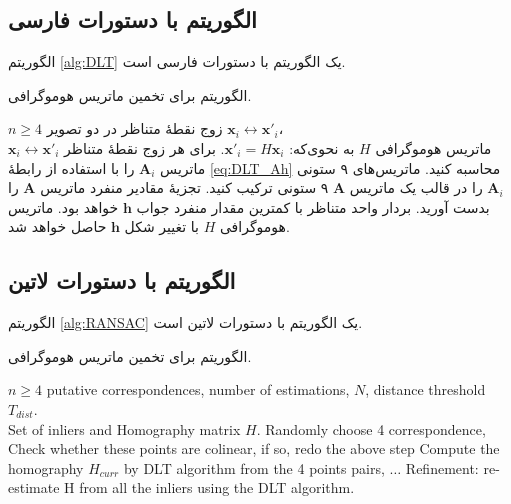 \subsection{الگوریتم با دستورات فارسی}
 الگوریتم 
 \eqref{alg:DLT} 
 یک الگوریتم با دستورات فارسی است.
\begin{algorithm}[t]
\onehalfspacing
\caption{الگوریتم  برای تخمین ماتریس هوموگرافی.} \label{alg:DLT}
\begin{algorithmic}[1]
\REQUIRE $n\geq4$ زوج نقطهٔ متناظر در دو تصویر 
${\mathbf{x}_i\leftrightarrow\mathbf{x}'_i}$،\\
\ENSURE ماتریس هوموگرافی $H$ به نحوی‌که: 
$\mathbf{x}'_i = H \mathbf{x}_i$.
  \STATE برای هر زوج نقطهٔ متناظر
$\mathbf{x}_i\leftrightarrow\mathbf{x}'_i$ 
ماتریس $\mathbf{A}_i$ را با استفاده از رابطهٔ \ref{eq:DLT_Ah} محاسبه کنید.
  \STATE ماتریس‌های ۹ ستونی  $\mathbf{A}_i$ را در قالب یک ماتریس $\mathbf{A}$ ۹ ستونی ترکیب کنید. 
  \STATE تجزیهٔ مقادیر منفرد   ماتریس $\mathbf{A}$ را بدست آورید. بردار واحد متناظر با کمترین مقدار منفرد جواب $\mathbf{h}$ خواهد بود.
  \STATE  ماتریس هوموگرافی $H$ با تغییر شکل $\mathbf{h}$ حاصل خواهد شد.
\end{algorithmic}
\end{algorithm}

\subsection{الگوریتم با دستورات لاتین}
الگوریتم
 \ref{alg:RANSAC}
  یک الگوریتم با دستورات لاتین است.

\begin{algorithm}[t]
\onehalfspacing
\caption{الگوریتم  برای تخمین ماتریس هوموگرافی.} \label{alg:RANSAC}
\begin{latin}
\begin{algorithmic}[1]
\REQUIRE $n\geq4$ putative correspondences, number of estimations, $N$, distance threshold $T_{dist}$.\\
\ENSURE Set of inliers and Homography matrix $H$.
  \STATE Randomly choose 4 correspondence,
  \STATE Check whether these points are colinear, if so, redo the above step
  \STATE Compute the homography $H_{curr}$ by DLT algorithm from the 4 points pairs,
  \STATE $\ldots$ %
  \ENDFOR
  \STATE Refinement: re-estimate H from all the inliers using the DLT algorithm.
\end{algorithmic}
\end{latin}
\end{algorithm}


